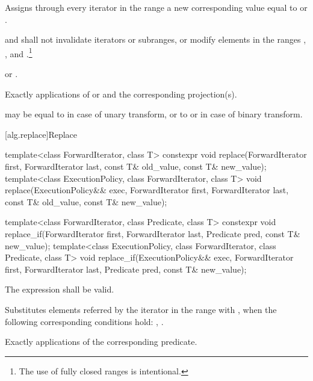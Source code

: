 \begin{addedblock}
\begin{itemdescr}
\pnum
\effects
Assigns through every iterator
in the range
a new
corresponding value equal to
or
.

\pnum
\requires
{} and 
shall not invalidate iterators or subranges, or modify elements in the ranges
,
,
and
.\footnote{The use of fully
closed ranges is intentional.}

\pnum
\returns
{}
 or .

\pnum
\complexity
Exactly
applications of
 or  and the corresponding projection(s).

\pnum
\remarks
{} may be equal to 
in case of unary transform,
or to  or 
in case of binary transform.
\end{itemdescr}
\end{addedblock}

[alg.replace]{Replace}

%
%
\begin{itemdecl}
template<class ForwardIterator, class T>
  constexpr void replace(ForwardIterator first, ForwardIterator last,
                         const T& old_value, const T& new_value);
template<class ExecutionPolicy, class ForwardIterator, class T>
  void replace(ExecutionPolicy&& exec,
               ForwardIterator first, ForwardIterator last,
               const T& old_value, const T& new_value);

template<class ForwardIterator, class Predicate, class T>
  constexpr void replace_if(ForwardIterator first, ForwardIterator last,
                            Predicate pred, const T& new_value);
template<class ExecutionPolicy, class ForwardIterator, class Predicate, class T>
  void replace_if(ExecutionPolicy&& exec,
                  ForwardIterator first, ForwardIterator last,
                  Predicate pred, const T& new_value);
\end{itemdecl}

\begin{itemdescr}
\pnum
\requires
The expression
shall be valid.

\pnum
\effects
Substitutes elements referred by the iterator
in the range 
with ,
when the following corresponding conditions hold:
, .

\pnum
\complexity
Exactly
applications of the corresponding predicate.
\end{itemdescr}

